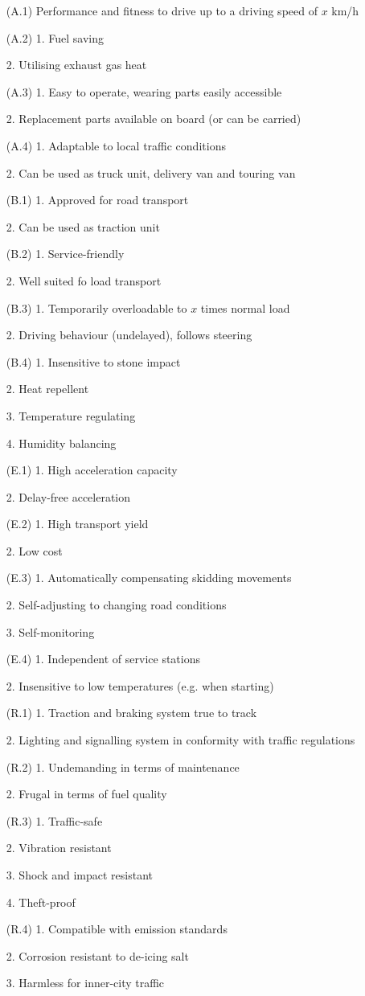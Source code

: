 \documentclass[11pt,a4paper]{article}
\begin{document}
\begin{itemize}[noitemsep]
\item[(A.1)] Performance and fitness to drive up to a driving speed of $x$
  km/h
\item[(A.2)] 1. Fuel saving\par 2. Utilising exhaust gas heat
\item[(A.3)] 1. Easy to operate, wearing parts easily accessible\par
  2. Replacement parts available on board (or can be carried)
\item[(A.4)] 1. Adaptable to local traffic conditions\par 
  2. Can be used as truck unit, delivery van and touring van
\item[(B.1)] 1. Approved for road transport\par 2. Can be used as traction unit
\item[(B.2)] 1. Service-friendly\par 2. Well suited fo load transport
\item[(B.3)] 1. Temporarily overloadable to $x$ times normal load\par
  2. Driving behaviour (undelayed), follows steering
\item[(B.4)] 1. Insensitive to stone impact\par 2. Heat repellent\par
  3. Temperature regulating\par 4. Humidity balancing
\item[(E.1)] 1. High acceleration capacity\par 2. Delay-free acceleration
\item[(E.2)] 1. High transport yield\par 2. Low cost
\item[(E.3)] 1. Automatically compensating skidding movements\par
  2. Self-adjusting to changing road conditions\par 3. Self-monitoring 
\item[(E.4)] 1. Independent of service stations\par 2. Insensitive to low
  temperatures (e.g. when starting)
\item[(R.1)] 1. Traction and braking system true to track\par
  2. Lighting and signalling system in conformity with traffic regulations
\item[(R.2)] 1. Undemanding in terms of maintenance\par 2. Frugal in terms of
  fuel quality 
\item[(R.3)] 1. Traffic-safe\par 2. Vibration resistant\par 3. Shock and
  impact resistant\par 4. Theft-proof
\item[(R.4)] 1. Compatible with emission standards\par 2. Corrosion resistant
  to de-icing salt\par 3. Harmless for inner-city traffic
\end{itemize}
\end{document}
